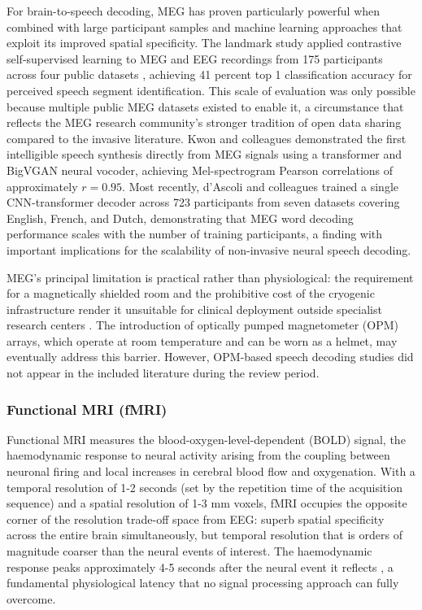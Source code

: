 For brain-to-speech decoding, MEG has proven particularly powerful when combined with large participant samples and machine learning approaches that exploit its improved spatial specificity. The landmark study \cite{Defossez2023} applied contrastive self-supervised learning to MEG and EEG recordings from 175 participants across four public datasets \cite{Gwilliams2023}, achieving 41 percent top 1 classification accuracy for perceived speech segment identification. This scale of evaluation was only possible because multiple public MEG datasets existed to enable it, a circumstance that reflects the MEG research community's stronger tradition of open data sharing compared to the invasive literature. Kwon and colleagues \cite{Kwon2024} demonstrated the first intelligible speech synthesis directly from MEG signals using a transformer and BigVGAN neural vocoder, achieving Mel-spectrogram Pearson correlations of approximately $r=0.95$. Most recently, d'Ascoli and colleagues \cite{dAscoli2025} trained a single CNN-transformer decoder across 723 participants from seven datasets covering English, French, and Dutch, demonstrating that MEG word decoding performance scales with the number of training participants, a finding with important implications for the scalability of non-invasive neural speech decoding.

MEG's principal limitation is practical rather than physiological: the requirement for a magnetically shielded room and the prohibitive cost of the cryogenic infrastructure render it unsuitable for clinical deployment outside specialist research centers \cite{Boto2018}. The introduction of optically pumped magnetometer (OPM) arrays, which operate at room temperature and can be worn as a helmet, may eventually address this barrier. However, OPM-based speech decoding studies did not appear in the included literature during the review period.

\subsubsection{Functional MRI (fMRI)}

Functional MRI measures the blood-oxygen-level-dependent (BOLD) signal, the haemodynamic response to neural activity arising from the coupling between neuronal firing and local increases in cerebral blood flow and oxygenation. With a temporal resolution of 1-2 seconds (set by the repetition time of the acquisition sequence) and a spatial resolution of 1-3 mm voxels, fMRI occupies the opposite corner of the resolution trade-off space from EEG: superb spatial specificity across the entire brain simultaneously, but temporal resolution that is orders of magnitude coarser than the neural events of interest. The haemodynamic response peaks approximately 4-5 seconds after the neural event it reflects \cite{Logothetis2010,Hemodynamic2007}, a fundamental physiological latency that no signal processing approach can fully overcome.

